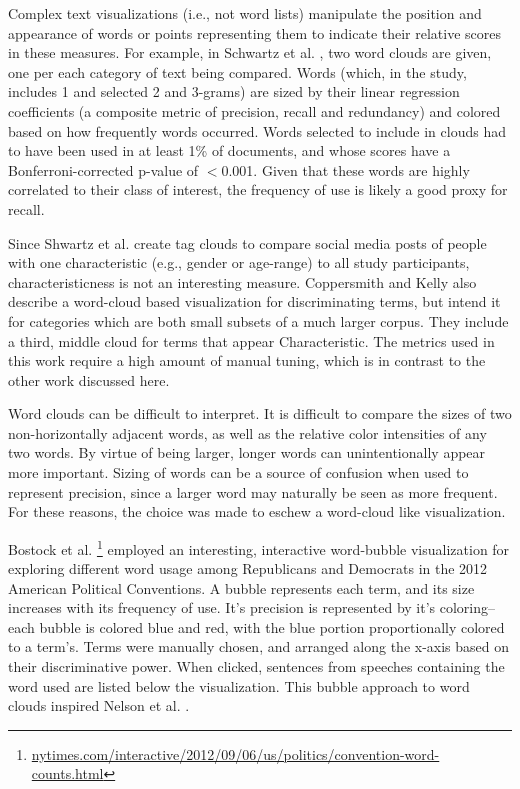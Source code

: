 \documentclass[11pt]{article}
\begin{document}
Complex text visualizations (i.e., not word lists) manipulate the position and appearance of words or points representing them to indicate their relative scores in these measures. For example, in Schwartz et al. , two word clouds are given, one per each category of text being compared.  Words (which, in the study, includes 1 and selected 2 and 3-grams) are sized by their linear regression coefficients (a composite metric of precision, recall and redundancy) and colored based on how frequently words occurred.  Words selected to include in clouds had to have been used in at least 1\% of documents, and whose scores have a Bonferroni-corrected p-value of $<$0.001. Given that these words are highly correlated to their class of interest, the frequency of use is likely a good proxy for recall.

Since Shwartz et al.  create tag clouds to compare social media posts of people with one characteristic (e.g., gender or age-range) to all study participants,  characteristicness is not an interesting measure.  Coppersmith and Kelly  also describe a word-cloud based visualization for discriminating terms, but intend it for categories which are both small subsets of a much larger corpus. They include a third, middle cloud for terms that appear Characteristic.  The metrics used in this work require a high amount of manual tuning, which is in contrast to the other work discussed here.

Word clouds can be difficult to interpret.  It is difficult to compare the sizes of two non-horizontally adjacent words,  as well as the relative color intensities of any two words. By virtue of being larger, longer words can unintentionally appear more important.  Sizing of words can be a source of confusion when used to represent precision, since a larger word may naturally be seen as more frequent.  For these reasons, the choice was made to eschew a word-cloud like visualization.

Bostock et al. \footnote{\href{http://www.nytimes.com/interactive/2012/09/06/us/politics/convention-word-counts.html}{nytimes.com/interactive/2012/09/06/us/politics/convention-word-counts.html}} employed an interesting, interactive word-bubble visualization for exploring different word usage among Republicans and Democrats in the 2012 American Political Conventions.  A bubble represents each term, and its size increases with its frequency of use.  It's precision is represented by it's coloring-- each bubble is colored blue and red, with the blue portion proportionally colored to a term's.  Terms were manually chosen, and arranged along the x-axis based on their discriminative power. When clicked, sentences from speeches containing the word used are listed below the visualization.  This bubble approach to word clouds inspired Nelson et al. .
\end{document}

